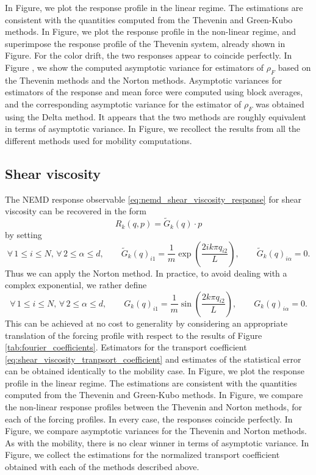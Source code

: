 In Figure, we plot the response profile in the linear regime. The estimations are consistent with the quantities computed from the Thevenin and Green-Kubo methods.
In Figure, we plot the response profile in the non-linear regime, and superimpose the response profile of the Thevenin system, already shown in Figure. 
For the color drift, the two responses appear to coincide perfectly.
In Figure , we show the computed asymptotic variance for estimators of $\rho_F$ based on the Thevenin methods and the Norton methods. 
Asymptotic variances for estimators of the response and mean force were computed using block averages, and the corresponding asymptotic variance for the estimator of $\rho_F$ was obtained using the Delta method.
It appears that the two methods are roughly equivalent in terms of asymptotic variance.
In Figure, we recollect the results from all the different methods used for mobility computations.

\subsection{Shear viscosity}
The NEMD response observable \eqref{eq:nemd_shear_viscosity_response} for shear viscosity can be recovered in the form 
\[R_k(q,p)= \widetilde{G}_k(q)\cdot p\]
 by setting
\begin{equation}
    \label{eq:shear_viscosity_forcing_alt}
    \forall\, 1\leq i\leq N,\,\forall\, 2\leq \alpha\leq d,\qquad \widetilde{G}_k(q)_{i1}=\frac{1}{m}\exp\left(\frac{2ik\pi q_{i2}}{L}\right),\qquad \widetilde{G}_k(q)_{i\alpha}=0.
\end{equation}
Thus we can apply the Norton method. In practice, to avoid dealing with a complex exponential, we rather define
\begin{equation}
    \label{eq:shear_viscosity_forcing}
    \forall\, 1\leq i\leq N,\,\forall\, 2\leq \alpha\leq d,\qquad G_k(q)_{i1}=\frac{1}{m}\sin\left(\frac{2k\pi q_{i2}}{L}\right),\qquad G_k(q)_{i\alpha}=0.
\end{equation}
This can be achieved at no cost to generality by considering an appropriate translation of the forcing profile with respect to the results of Figure \ref{tab:fourier_coefficients}.
Estimators for the transport coefficient \eqref{eq:shear_viscosity_tranpsort_coefficient} and estimates of the statistical error can be obtained identically to the mobility case.
In Figure, we plot the response profile in the linear regime. The estimations are consistent with the quantities computed from the Thevenin and Green-Kubo methods.
In Figure, we compare the non-linear response profiles between the Thevenin and Norton methods, for each of the forcing profiles. In every case, the responses coincide perfectly.
In Figure, we compare asymptotic variances for the Thevenin and Norton methods. As with the mobility, there is no clear winner in terms of asymptotic variance.
In Figure, we collect the estimations for the normalized transport coefficient obtained with each of the methods described above.

